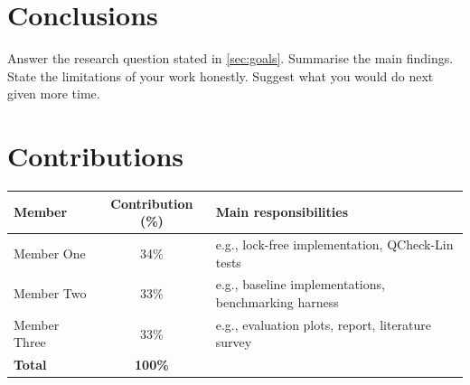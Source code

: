 \documentclass[11pt,a4paper]{article}
\begin{document}
\section{Conclusions}
\label{sec:conclusions}

Answer the research question stated in \cref{sec:goals}. Summarise the main
findings. State the limitations of your work honestly. Suggest what you
would do next given more time.

\section*{Contributions}
\label{sec:contributions}


\begin{center}
\begin{tabular}{@{}lcl@{}}
\toprule
\textbf{Member} & \textbf{Contribution (\%)} & \textbf{Main responsibilities} \\
\midrule
Member One   & 34\% & e.g., lock-free implementation, QCheck-Lin tests \\
Member Two   & 33\% & e.g., baseline implementations, benchmarking harness \\
Member Three & 33\% & e.g., evaluation plots, report, literature survey \\
\midrule
\textbf{Total} & \textbf{100\%} & \\
\bottomrule
\end{tabular}
\end{center}



\end{document}
